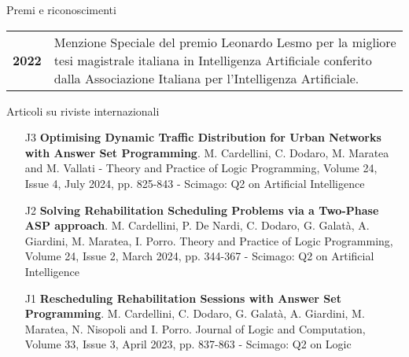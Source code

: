 \documentclass{resume} %
\begin{document}
 \begin{rSection}{Premi e riconoscimenti}
 \begin{tabularx}{0.95\textwidth} {lp{14cm}}

\textbf{2022}  & Menzione Speciale del premio Leonardo Lesmo per la migliore tesi magistrale italiana in Intelligenza Artificiale conferito dalla Associazione Italiana per l'Intelligenza Artificiale. 
  \end{tabularx}
\end{rSection}

\begin{rSection}{Articoli su riviste internazionali}
\begin{enumerate}[leftmargin=5mm]
	\item[J3] \textbf{Optimising Dynamic Traffic Distribution for Urban Networks with Answer Set Programming}. M. Cardellini, C. Dodaro, M. Maratea and M. Vallati - Theory and Practice of Logic Programming,  Volume 24, Issue 4, July 2024, pp. 825-843 - Scimago: Q2 on Artificial Intelligence
	\item[J2] \textbf{Solving Rehabilitation Scheduling Problems via a Two-Phase ASP approach}. M. Cardellini, P. De Nardi, C. Dodaro, G. Galat\`a, A. Giardini, M. Maratea, I. Porro. Theory and Practice of Logic Programming, Volume 24, Issue 2, March 2024, pp. 344-367 - Scimago: Q2 on Artificial Intelligence
	\item[J1] \textbf{Rescheduling Rehabilitation Sessions with Answer Set Programming}. M. Cardellini, C. Dodaro, G. Galat\`a, A. Giardini, M. Maratea, N. Nisopoli and I. Porro. Journal of Logic and Computation, Volume 33, Issue 3, April 2023, pp. 837-863 - Scimago: Q2 on Logic
\end{enumerate}
\end{rSection}
 
\end{document}
